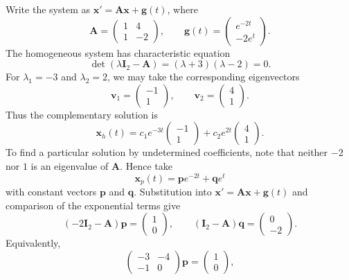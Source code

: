 \documentclass[11pt,oneside]{article}
\begin{document}
\begin{solution}
Write the system as $\mathbf{x}'=\mathbf{A}\mathbf{x}+\mathbf{g}(t)$, where
\[
    \mathbf{A}=\begin{pmatrix}1&4\\1&-2\end{pmatrix},
    \qquad
    \mathbf{g}(t)=\begin{pmatrix}e^{-2t}\\-2e^t\end{pmatrix}.
\]
The homogeneous system has characteristic equation
\[
    \det(\lambda\mathbf{I}_2-\mathbf{A})
    =(\lambda+3)(\lambda-2)=0.
\]
For $\lambda_1=-3$ and $\lambda_2=2$, we may take the corresponding eigenvectors
\[
    \mathbf{v}_1=\begin{pmatrix}-1\\1\end{pmatrix},
    \qquad
    \mathbf{v}_2=\begin{pmatrix}4\\1\end{pmatrix}.
\]
Thus the complementary solution is
\[
    \mathbf{x}_h(t)
    =c_1e^{-3t}\begin{pmatrix}-1\\1\end{pmatrix}
    +c_2e^{2t}\begin{pmatrix}4\\1\end{pmatrix}.
\]
To find a particular solution by undetermined coefficients, note that neither $-2$ nor $1$ is an eigenvalue of $\mathbf{A}$. Hence take
\[
    \mathbf{x}_p(t)=\mathbf{p}e^{-2t}+\mathbf{q}e^t
\]
with constant vectors $\mathbf{p}$ and $\mathbf{q}$. Substitution into $\mathbf{x}'=\mathbf{A}\mathbf{x}+\mathbf{g}(t)$ and comparison of the exponential terms give
\[
    (-2\mathbf{I}_2-\mathbf{A})\mathbf{p}
       =\begin{pmatrix}1\\0\end{pmatrix},
    \qquad
    (\mathbf{I}_2-\mathbf{A})\mathbf{q}
       =\begin{pmatrix}0\\-2\end{pmatrix}.
\]
Equivalently,
\[
    \begin{pmatrix}-3&-4\\-1&0\end{pmatrix}\mathbf{p}
       =\begin{pmatrix}1\\0\end{pmatrix},
\]
\end{solution}
\end{document}
